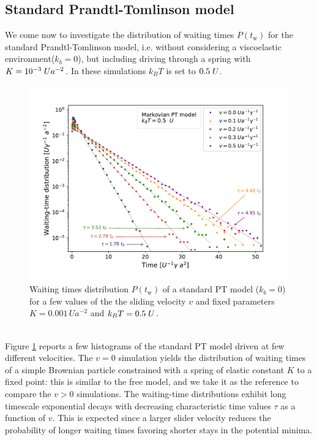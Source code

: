 \subsection{Standard Prandtl-Tomlinson model}
\label{sec:spiegobinning}
We come now to investigate the distribution of waiting times $P(t_\text{w})$ for the standard Prandtl-Tomlinson model, i.e. without considering a viscoelastic environment($k_b=0$), but including driving through a spring with $K=10^{-3}\hspace{0.1cm}Ua^{-2}$. In these simulations $k_BT$ is set to $0.5\hspace{0.1cm}U$.
\begin{figure}
    \centering
    \includegraphics[width=\textwidth]{standard_PT_definitivo.pdf}
    \caption{Waiting times distribution $P(t_\text{w})$ of a standard PT model ($k_b=0$) for a few values of the the sliding velocity $v$ and fixed parameters $K=0.001\, Ua^{-2}$ and $k_BT=0.5\hspace{0.1cm}U$.}
    \label{fig:simplePT}
\end{figure}
\\
Figure \ref{fig:simplePT} reports a few histograms of the standard PT model driven at few different velocities. The $v=0$ simulation yields the distribution of waiting times of a simple Brownian particle constrained with a spring of elastic constant $K$ to a fixed point: this is similar to the free model, and we take it as the reference to compare the $v>0$ simulations. The waiting-time distributions exhibit long timescale exponential decays with decreasing characteristic time values $\tau$ as a function of $v$. This is expected since a larger slider velocity reduces the probability of longer waiting times favoring shorter stays in the potential minima.
